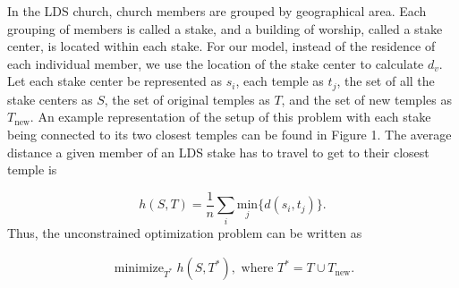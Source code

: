 \documentclass[twoside,twocolumn]{article}
\DeclareMathOperator*{\minimize}{minimize}
\begin{document}
In the LDS church, church members are grouped by geographical area.
Each grouping of members is called a stake, and a building of worship, called a stake center, is located within each stake.
For our model, instead of the residence of each individual member, we use the location of the stake center to calculate $d_{v}$.
Let each stake center be represented as $s_i$, each temple as $t_j$, the set of all the stake centers as $S$, the set of original temples as $T$, and the set of new temples as $T_{\text{new}}$. %
An example representation of the setup of this problem with each stake being connected to its two closest temples can be found in Figure 1.
The average distance a given member of an LDS stake has to travel to get to their closest temple is

\begin{equation}
	h(S,T) = \frac{1}{n} \sum_i \underset{j}{\text{min}}\{d(s_i,t_j)\}.
\end{equation}
Thus, the unconstrained optimization problem can be written as

\begin{equation}
\begin{aligned}
	\minimize_{T^*} h(S,T^*), \text{ where } T^* = T \cup T_{\text{new}}.
\end{aligned}
\end{equation}
\end{document}

